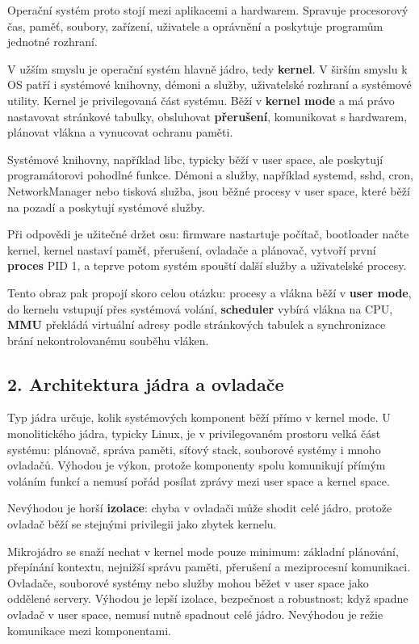 Operační systém proto stojí mezi aplikacemi a hardwarem. Spravuje procesorový čas, paměť, soubory, zařízení, uživatele a oprávnění a poskytuje programům jednotné rozhraní.

V užším smyslu je operační systém hlavně jádro, tedy \textbf{kernel}. V širším smyslu k OS patří i systémové knihovny, démoni a služby, uživatelské rozhraní a systémové utility. Kernel je privilegovaná část systému. Běží v \textbf{kernel mode} a má právo nastavovat stránkové tabulky, obsluhovat \textbf{přerušení}, komunikovat s hardwarem, plánovat vlákna a vynucovat ochranu paměti.

Systémové knihovny, například libc, typicky běží v user space, ale poskytují programátorovi pohodlné funkce. Démoni a služby, například systemd, sshd, cron, NetworkManager nebo tisková služba, jsou běžné procesy v user space, které běží na pozadí a poskytují systémové služby.

Při odpovědi je užitečné držet osu: firmware nastartuje počítač, bootloader načte kernel, kernel nastaví paměť, přerušení, ovladače a plánovač, vytvoří první \textbf{proces} PID 1, a teprve potom systém spouští další služby a uživatelské procesy.

Tento obraz pak propojí skoro celou otázku: procesy a vlákna běží v \textbf{user mode}, do kernelu vstupují přes systémová volání, \textbf{scheduler} vybírá vlákna na CPU, \textbf{MMU} překládá virtuální adresy podle stránkových tabulek a synchronizace brání nekontrolovanému souběhu vláken.

\subsection*{2. Architektura jádra a ovladače}

Typ jádra určuje, kolik systémových komponent běží přímo v kernel mode. U monolitického jádra, typicky Linux, je v privilegovaném prostoru velká část systému: plánovač, správa paměti, síťový stack, souborové systémy i mnoho ovladačů. Výhodou je výkon, protože komponenty spolu komunikují přímým voláním funkcí a nemusí pořád posílat zprávy mezi user space a kernel space.

Nevýhodou je horší \textbf{izolace}: chyba v ovladači může shodit celé jádro, protože ovladač běží se stejnými privilegii jako zbytek kernelu.

Mikrojádro se snaží nechat v kernel mode pouze minimum: základní plánování, přepínání kontextu, nejnižší správu paměti, přerušení a meziprocesní komunikaci. Ovladače, souborové systémy nebo služby mohou běžet v user space jako oddělené servery. Výhodou je lepší izolace, bezpečnost a robustnost; když spadne ovladač v user space, nemusí nutně spadnout celé jádro. Nevýhodou je režie komunikace mezi komponentami.

